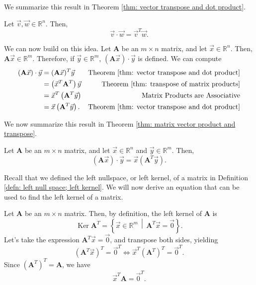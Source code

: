\documentclass[]{book}
\DeclareMathOperator{\kernel}{Ker}
\newcommand{\suchthat}{\,\middle|\,}
\newcommand{\mat}[1]{\ensuremath{\mathbf{#1}}}
\newcommand{\R}{\ensuremath{\mathbb{R}}}
\begin{document}
We summarize this result in Theorem \ref{thm: vector transpose and dot product}.

\begin{theorem}
    \label{thm: vector transpose and dot product}
    Let $\vec{v},\vec{w} \in \R^n$. Then,
    \[\vec{v} \cdot \vec{w} = \vec{v}^T\vec{w}.\]
\end{theorem}

We can now build on this idea. Let $\mat{A}$ be an $m \times n$ matrix, and let $\vec{x} \in \R^n$. Then, $\mat{A}\vec{x} \in \R^m$. Therefore, if $\vec{y} \in \R^m$, $(\mat{A}\vec{x})\cdot\vec{y}$ is defined. We can compute
\begin{align*}
    (\mat{A}\vec{x})\cdot\vec{y} &= (\mat{A}\vec{x})^T\vec{y} & \text{Theorem \ref{thm: vector transpose and dot product}} \\
    &= \left(\vec{x}^T\mat{A}^T\right)\vec{y} & \text{Theorem \ref{thm: transpose of matrix products}} \\
    &= \vec{x}^T\left(\mat{A}^T\vec{y}\right) & \text{Matrix Products are Associative} \\
    &= \vec{x}\left(\mat{A}^T\vec{y}\right). & \text{Theorem \ref{thm: vector transpose and dot product}}
\end{align*}

We now summarize this result in Theorem \ref{thm: matrix vector product and transpose}.

\begin{theorem}
    \label{thm: matrix vector product and transpose}
    Let $\mat{A}$ be an $m \times n$ matrix, and let $\vec{x} \in \R^n$ and $\vec{y} \in \R^m$. Then,
    \[\left(\mat{A}\vec{x}\right)\cdot\vec{y} = \vec{x}\left(\mat{A}^T\vec{y}\right).\]
\end{theorem}

Recall that we defined the left nullspace, or left kernel, of a matrix in Definition \ref{defn: left null space; left kernel}. We will now derive an equation that can be used to find the left kernel of a matrix. 

Let $\mat{A}$ be an $m \times n$ matrix. Then, by definition, the left kernel of $\mat{A}$ is
\[\kernel\mat{A}^T = \left\{\vec{x} \in \R^m \suchthat \mat{A}^T\vec{x} = \vec{0}\right\}.\]
Let's take the expression $\mat{A}^T\vec{x}=\vec{0}$, and transpose both sides, yielding
\[\left(\mat{A}^T\vec{x}\right)^T = \vec{0}^T \Longleftrightarrow \vec{x}^T \left(\mat{A}^T\right)^T = \vec{0}^T.\]
Since $\left(\mat{A}^T\right)^T = \mat{A}$, we have
\[\vec{x}^T\mat{A} = \vec{0}^T.\]
\end{document}
